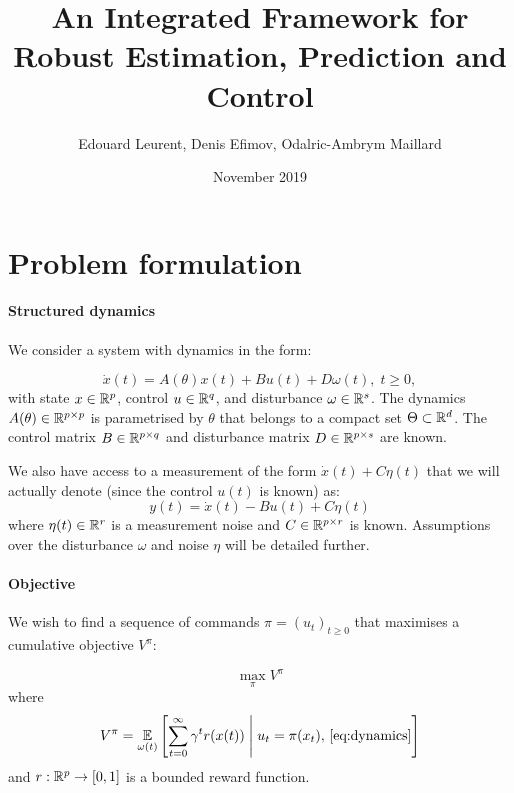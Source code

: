 \documentclass{article}
\title{An Integrated Framework for Robust Estimation, Prediction and Control}
\author{Edouard Leurent, Denis Efimov, Odalric-Ambrym Maillard}
\date{November 2019}
\begin{document}
\maketitle

\section{Problem formulation}

\paragraph{Structured dynamics}
We consider a system with dynamics in the form:

\begin{equation}
\label{eq:dynamics}
\dot{x}(t)=A(\theta)x(t) + B u(t) + D \omega(t),\;t\geq0,
\end{equation}
with state $x\in\mathbb{R}^p$, control $u\in\mathbb{R}^q$, and disturbance $\omega\in\mathbb{R}^s$. The dynamics $A(\theta)\in\mathbb{R}^{p\times p}$  is parametrised by $\theta$ that belongs to a compact set $\Theta \subset \mathbb{R}^d$. The control matrix $B\in\mathbb{R}^{p\times q}$ and disturbance matrix $D\in\mathbb{R}^{p\times s}$ are known.

We also have access to a measurement of the form
$
    \dot{x}(t) + C\eta(t)
$
that we will actually denote (since the control $u(t)$ is known) as:
\begin{equation}
\label{eq:measurement}
    y(t) = \dot{x}(t) - Bu(t) + C\eta(t)
\end{equation}
where $\eta(t)\in\mathbb{R}^r$ is a measurement noise and $C\in\mathbb{R}^{p\times r}$ is known. Assumptions over the disturbance $\omega$ and noise $\eta$ will be detailed further.

\paragraph{Objective}

We wish to find a sequence of commands $\pi=(u_t)_{t\geq 0}$ that maximises a cumulative objective $V^\pi$:


\begin{equation}
\max_\pi V^\pi
\end{equation}
where
\begin{equation}
\label{eq:optimal-control}
V^\pi = \operatorname*{\mathbb{E}}\limits_{\omega(t)}\left[\sum_{t=0}^\infty \gamma^t r(x(t))\;\middle|\; u_t = \pi(x_t),\,\eqref{eq:dynamics}\right]
\end{equation}
and $r:\mathbb{R}^p\rightarrow[0,1]$ is a bounded reward function.
\end{document}
